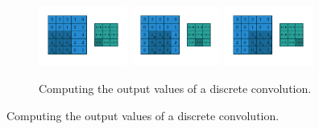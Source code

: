 \begin{figure}[ht]
\begin{subfigure}[b]{0.8\textwidth}
        \includegraphics[width=0.32\textwidth]{chapters/assets/2d-conv-example/numerical_no_padding_no_strides_06.pdf}
        \includegraphics[width=0.32\textwidth]{chapters/assets/2d-conv-example/numerical_no_padding_no_strides_07.pdf}
        \includegraphics[width=0.32\textwidth]{chapters/assets/2d-conv-example/numerical_no_padding_no_strides_08.pdf}
        \caption{\label{fig:numerical_no_padding_no_strides} Computing the output
            values of a discrete convolution.}
     \end{subfigure}
     

\end{figure}
